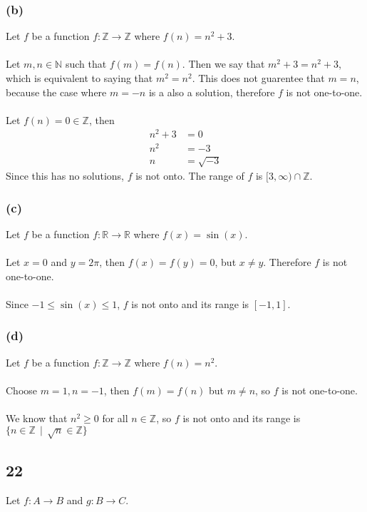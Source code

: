 \documentclass{article}
\begin{document}
\subsubsection*{(b)}
Let $f$ be a function $f : \mathbb{Z} \rightarrow \mathbb{Z}$ where $f(n) = n^2 + 3$.
\\\\
Let $m,n \in \mathbb{N}$ such that $f(m) = f(n)$.
Then we say that $m^2 + 3 = n^2 + 3$, which is equivalent to saying that $m^2 = n^2$.
This does not guarentee that $m = n$, because the case where $m = -n$ is a also a solution, therefore $f$ is not one-to-one.
\\\\
Let $f(n) = 0 \in \mathbb{Z}$, then 
\begin{align*}
    n^2 + 3 & = 0 \\
    n^2 & = -3 \\
    n & = \sqrt{-3}
\end{align*}
Since this has no solutions, $f$ is not onto.
The range of $f$ is $[3, \infty) \cap \mathbb{Z}$.
\subsubsection*{(c)}
Let $f$ be a function $f : \mathbb{R} \rightarrow \mathbb{R}$ where $f(x) = \sin(x)$.
\\\\
Let $x = 0$ and $y = 2 \pi$, then $f(x) = f(y) = 0$, but $x \neq y$.
Therefore $f$ is not one-to-one.
\\\\
Since $-1 \leqslant \sin(x) \leqslant 1$, $f$ is not onto and its range is $[-1, 1]$.
\subsubsection*{(d)}
Let $f$ be a function $f : \mathbb{Z} \rightarrow \mathbb{Z}$ where $f(n) = n^2$.
\\\\
Choose $m = 1, n = -1$, then $f(m) = f(n)$ but $m \neq n$, so $f$ is not one-to-one.
\\\\
We know that $n^2 \geqslant 0$ for all $n \in \mathbb{Z}$, so $f$ is not onto and its range is $\{n \in \mathbb{Z} \ \ | \ \ \sqrt{n} \in \mathbb{Z} \}$

\subsection*{22}
Let $f: A \rightarrow B$ and $g: B \rightarrow C$.
\end{document}
